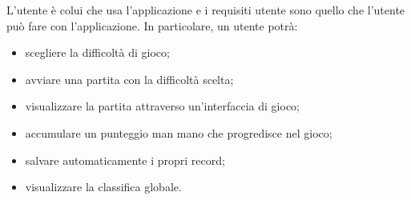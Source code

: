 L'utente è colui che usa l'applicazione e i requisiti utente sono quello che l'utente può fare con l'applicazione.
In particolare, un utente potrà:
\begin{itemize}
	\item scegliere la difficoltà di gioco;
	\item avviare una partita con la difficoltà scelta;
	\item visualizzare la partita attraverso un'interfaccia di gioco;
	\item accumulare un punteggio man mano che progredisce nel gioco;
	\item salvare automaticamente i propri record;
	\item visualizzare la classifica globale.
\end{itemize}